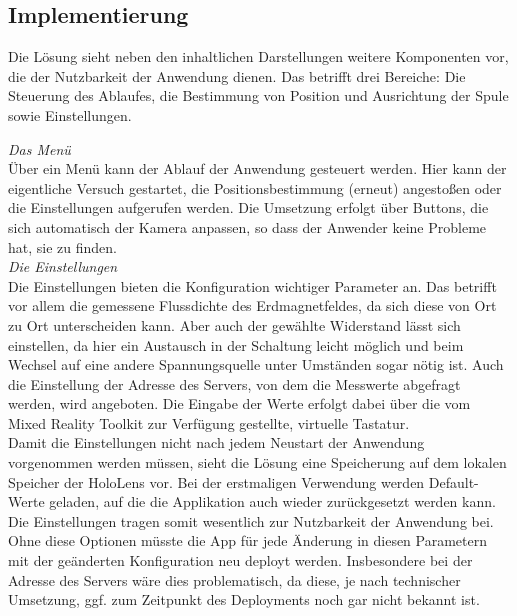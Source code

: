 \subsection{Implementierung}
\label{sec-4-3}
Die Lösung sieht neben den inhaltlichen Darstellungen weitere Komponenten vor, die der Nutzbarkeit der Anwendung dienen. Das betrifft drei Bereiche: Die Steuerung des Ablaufes, die Bestimmung von Position und Ausrichtung der Spule sowie Einstellungen.

\textit{Das Menü}\\
Über ein Menü kann der Ablauf der Anwendung gesteuert werden. Hier kann der eigentliche Versuch gestartet, die Positionsbestimmung (erneut) angestoßen oder die Einstellungen aufgerufen werden. Die Umsetzung erfolgt über Buttons, die sich automatisch der Kamera anpassen, so dass der Anwender keine Probleme hat, sie zu finden.\\

\textit{Die Einstellungen}\\
Die Einstellungen bieten die Konfiguration wichtiger Parameter an. Das betrifft vor allem die gemessene Flussdichte des Erdmagnetfeldes, da sich diese von Ort zu Ort unterscheiden kann. Aber auch der gewählte Widerstand lässt sich einstellen, da hier ein Austausch in der Schaltung leicht möglich und beim Wechsel auf eine andere Spannungsquelle unter Umständen sogar nötig ist. Auch die Einstellung der Adresse des Servers, von dem die Messwerte abgefragt werden, wird angeboten. Die Eingabe der Werte erfolgt dabei über die vom Mixed Reality Toolkit zur Verfügung gestellte, virtuelle Tastatur.\\

Damit die Einstellungen nicht nach jedem Neustart der Anwendung vorgenommen werden müssen, sieht die Lösung eine Speicherung auf dem lokalen Speicher der HoloLens vor. Bei der erstmaligen Verwendung werden Default-Werte geladen, auf die die Applikation auch wieder zurückgesetzt werden kann. Die Einstellungen tragen somit wesentlich zur Nutzbarkeit der Anwendung bei. Ohne diese Optionen müsste die App für jede Änderung in diesen Parametern mit der geänderten Konfiguration neu deployt werden. Insbesondere bei der Adresse des Servers wäre dies problematisch, da diese, je nach technischer Umsetzung, ggf. zum Zeitpunkt des Deployments noch gar nicht bekannt ist.\\


